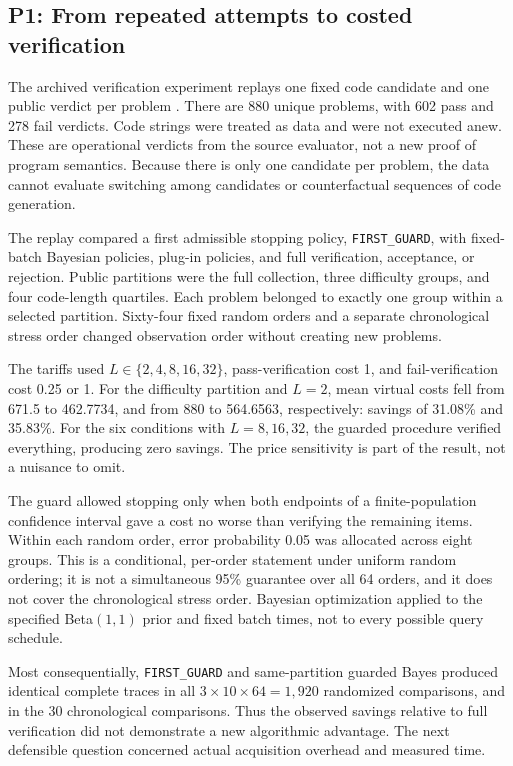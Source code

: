 \documentclass[10pt,twocolumn,letterpaper]{article}
\begin{document}
\subsection{P1: From repeated attempts to costed verification}
The archived verification experiment replays one fixed code candidate and one public verdict per problem \cite{pfpaid}. There are 880 unique problems, with 602 pass and 278 fail verdicts. Code strings were treated as data and were not executed anew. These are operational verdicts from the source evaluator, not a new proof of program semantics. Because there is only one candidate per problem, the data cannot evaluate switching among candidates or counterfactual sequences of code generation.

The replay compared a first admissible stopping policy, \texttt{FIRST\_GUARD}, with fixed-batch Bayesian policies, plug-in policies, and full verification, acceptance, or rejection. Public partitions were the full collection, three difficulty groups, and four code-length quartiles. Each problem belonged to exactly one group within a selected partition. Sixty-four fixed random orders and a separate chronological stress order changed observation order without creating new problems.

The tariffs used $L\in\{2,4,8,16,32\}$, pass-verification cost 1, and fail-verification cost 0.25 or 1. For the difficulty partition and $L=2$, mean virtual costs fell from 671.5 to 462.7734, and from 880 to 564.6563, respectively: savings of 31.08\% and 35.83\%. For the six conditions with $L=8,16,32$, the guarded procedure verified everything, producing zero savings. The price sensitivity is part of the result, not a nuisance to omit.

The guard allowed stopping only when both endpoints of a finite-population confidence interval gave a cost no worse than verifying the remaining items. Within each random order, error probability 0.05 was allocated across eight groups. This is a conditional, per-order statement under uniform random ordering; it is not a simultaneous 95\% guarantee over all 64 orders, and it does not cover the chronological stress order. Bayesian optimization applied to the specified Beta$(1,1)$ prior and fixed batch times, not to every possible query schedule.

Most consequentially, \texttt{FIRST\_GUARD} and same-partition guarded Bayes produced identical complete traces in all $3\times10\times64=1,920$ randomized comparisons, and in the 30 chronological comparisons. Thus the observed savings relative to full verification did not demonstrate a new algorithmic advantage. The next defensible question concerned actual acquisition overhead and measured time.
\end{document}
